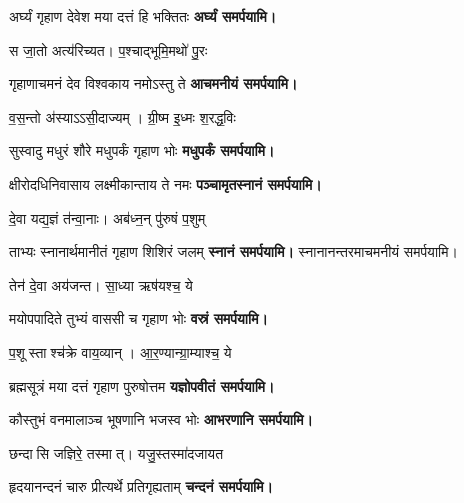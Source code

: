 \begin{center}
{अर्घ्यं गृहाण देवेश मया दत्तं हि भक्तितः}
\textbf{\devAya{} अर्घ्यं समर्पयामि।}

{स जा॒तो अत्य॑रिच्यत। प॒श्चाद्भूमि॒मथो॑ पु॒रः}

{गृहाणाचमनं देव विश्वकाय नमोऽस्तु ते}
\textbf{\devAya{} आचमनीयं समर्पयामि।}
\medskip


{व॒स॒न्तो अ॑स्याऽऽसी॒दाज्यम्। ग्री॒ष्म इ॒ध्मः श॒रद्ध॒विः}

{सुस्वादु मधुरं शौरे मधुपर्कं गृहाण भोः}
\textbf{\devAya{} मधुपर्कं समर्पयामि।}
\medskip


{क्षीरोदधिनिवासाय लक्ष्मीकान्ताय ते नमः}
\textbf{\devAya{} पञ्चामृतस्नानं समर्पयामि।}
\medskip

{दे॒वा यद्य॒ज्ञं त॑न्वा॒नाः। अब॑ध्न॒न् पु॑रुषं प॒शुम्}

{ताभ्यः स्नानार्थमानीतं गृहाण शिशिरं जलम्}
\textbf{\devAya{} स्नानं समर्पयामि।}
स्नानानन्तरमाचमनीयं समर्पयामि।
\medskip

{तेन॑ दे॒वा अय॑जन्त। सा॒ध्या ऋष॑यश्च॒ ये}

{मयोपपादिते तुभ्यं वाससी च गृहाण भोः}
\textbf{\devAya{} वस्रं समर्पयामि।}
\medskip

{प॒शूस्ताश्च॑क्रे वाय॒व्यान्। आ॒र॒ण्यान्ग्रा॒म्याश्च॒ ये}

{ब्रह्मसूत्रं मया दत्तं गृहाण पुरुषोत्तम}
\textbf{\devAya{} यज्ञोपवीतं समर्पयामि। }
\medskip

{कौस्तुभं वनमालाञ्च भूषणानि भजस्व भोः}
\textbf{\devAya{} आभरणानि समर्पयामि।} 
\medskip

{छन्दासि जज्ञिरे॒ तस्मात्। यजु॒स्तस्मा॑दजायत}

{हृदयानन्दनं चारु प्रीत्यर्थे प्रतिगृह्यताम्}
\textbf{\devAya{} चन्दनं समर्पयामि।}
\medskip


\end{center}
